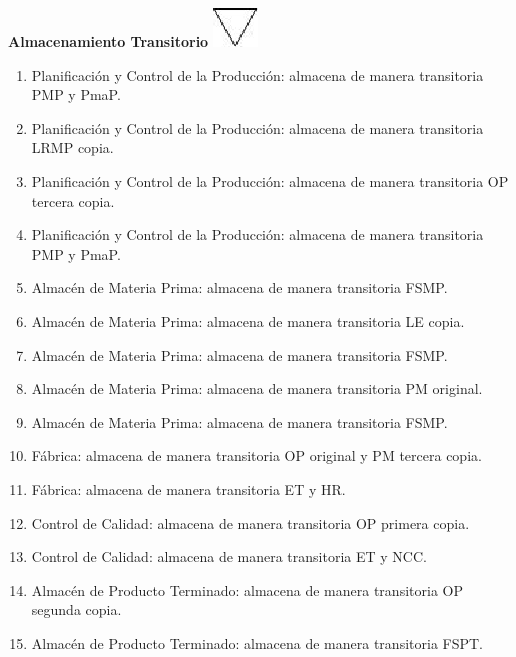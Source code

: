 \begin{center}
  \textbf{Almacenamiento Transitorio}
  \includegraphics{./Images/Simbolos/simbolo-Almacenamiento-Transitorio.png}
\end{center}
\begin{enumerate}
  \item Planificaci\'on y Control de la Producci\'on: almacena de manera transitoria PMP y PmaP.
  \item Planificaci\'on y Control de la Producci\'on: almacena de manera transitoria LRMP copia.
  \item Planificaci\'on y Control de la Producci\'on: almacena de manera transitoria OP tercera copia.
  \item Planificaci\'on y Control de la Producci\'on: almacena de manera transitoria PMP y PmaP.
  \item Almac\'en de Materia Prima: almacena de manera transitoria FSMP.
  \item Almac\'en de Materia Prima: almacena de manera transitoria LE copia.
  \item Almac\'en de Materia Prima: almacena de manera transitoria FSMP.
  \item Almac\'en de Materia Prima: almacena de manera transitoria PM original.  
  \item Almac\'en de Materia Prima: almacena de manera transitoria FSMP.
  \item F\'abrica: almacena de manera transitoria OP original y PM tercera copia.
  \item F\'abrica: almacena de manera transitoria ET y HR.
  \item Control de Calidad: almacena de manera transitoria OP primera copia.
  \item Control de Calidad: almacena de manera transitoria ET y NCC.
  \item Almac\'en de Producto Terminado: almacena de manera transitoria OP segunda copia.
  \item Almac\'en de Producto Terminado: almacena de manera transitoria FSPT.
\end{enumerate}

